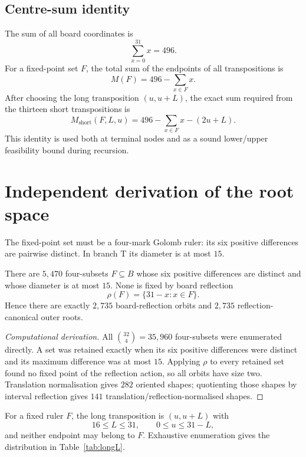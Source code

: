 \documentclass[11pt,a4paper]{article}
\theoremstyle{definition}\newtheorem{definition}[theorem]{Definition}\newtheorem{remark}[theorem]{Remark}
\begin{document}
\subsection{Centre-sum identity}
The sum of all board coordinates is
\[
\sum_{x=0}^{31}x=496.
\]
For a fixed-point set $F$, the total sum of the endpoints of all transpositions is
\[
M(F)=496-\sum_{x\in F}x.
\]
After choosing the long transposition $(u,u+L)$, the exact sum required from the thirteen short transpositions is
\begin{equation}\label{eq:centresum}
M_{\mathrm{short}}(F,L,u)=496-\sum_{x\in F}x-(2u+L).
\end{equation}
This identity is used both at terminal nodes and as a sound lower/upper feasibility bound during recursion.

\section{Independent derivation of the root space}
The fixed-point set must be a four-mark Golomb ruler: its six positive differences are pairwise distinct.  In branch $\mathrm T$ its diameter is at most $15$.

\begin{proposition}
There are $5{,}470$ four-subsets $F\subseteq B$ whose six positive differences are distinct and whose diameter is at most $15$.  None is fixed by board reflection
\[
\rho(F)=\{31-x:x\in F\}.
\]
Hence there are exactly $2{,}735$ board-reflection orbits and $2{,}735$ reflection-canonical outer roots.
\end{proposition}

\begin{proof}[Computational derivation]
All $\binom{32}{4}=35{,}960$ four-subsets were enumerated directly.  A set was retained exactly when its six positive differences were distinct and its maximum difference was at most $15$.  Applying $\rho$ to every retained set found no fixed point of the reflection action, so all orbits have size two.  Translation normalisation gives $282$ oriented shapes; quotienting those shapes by interval reflection gives $141$ translation/reflection-normalised shapes.
\end{proof}

For a fixed ruler $F$, the long transposition is $(u,u+L)$ with
\[
16\le L\le31,\qquad 0\le u\le31-L,
\]
and neither endpoint may belong to $F$.  Exhaustive enumeration gives the distribution in Table~\ref{tab:longL}.
\end{document}
